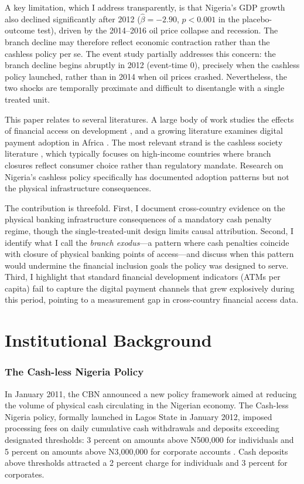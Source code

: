 \documentclass[12pt]{article}
\begin{document}
A key limitation, which I address transparently, is that Nigeria's GDP growth also declined significantly after 2012 ($\hat{\beta} = -2.90$, $p < 0.001$ in the placebo-outcome test), driven by the 2014--2016 oil price collapse and recession. The branch decline may therefore reflect economic contraction rather than the cashless policy per se. The event study partially addresses this concern: the branch decline begins abruptly in 2012 (event-time 0), precisely when the cashless policy launched, rather than in 2014 when oil prices crashed. Nevertheless, the two shocks are temporally proximate and difficult to disentangle with a single treated unit.

This paper relates to several literatures. A large body of work studies the effects of financial access on development \citep{burgess2005banks, beck2007reaching, allen2014african}, and a growing literature examines digital payment adoption in Africa \citep{aker2010mobile, jack2014risk, suri2016long, economides2017mobile}. The most relevant strand is the cashless society literature \citep{rogoff2016curse, humphrey2001replacement}, which typically focuses on high-income countries where branch closures reflect consumer choice rather than regulatory mandate. Research on Nigeria's cashless policy specifically \citep{ozili2018impact, ozili2020contesting} has documented adoption patterns but not the physical infrastructure consequences.

The contribution is threefold. First, I document cross-country evidence on the physical banking infrastructure consequences of a mandatory cash penalty regime, though the single-treated-unit design limits causal attribution. Second, I identify what I call the \textit{branch exodus}---a pattern where cash penalties coincide with closure of physical banking points of access---and discuss when this pattern would undermine the financial inclusion goals the policy was designed to serve. Third, I highlight that standard financial development indicators (ATMs per capita) fail to capture the digital payment channels that grew explosively during this period, pointing to a measurement gap in cross-country financial access data.

\section{Institutional Background}

\subsubsection*{The Cash-less Nigeria Policy} In January 2011, the CBN announced a new policy framework aimed at reducing the volume of physical cash circulating in the Nigerian economy. The Cash-less Nigeria policy, formally launched in Lagos State in January 2012, imposed processing fees on daily cumulative cash withdrawals and deposits exceeding designated thresholds: 3 percent on amounts above \textnormal{N}500,000 for individuals and 5 percent on amounts above \textnormal{N}3,000,000 for corporate accounts \citep{cbn2012cashless}. Cash deposits above thresholds attracted a 2 percent charge for individuals and 3 percent for corporates.
\end{document}
